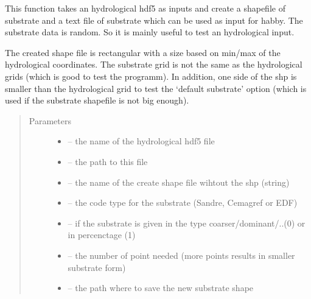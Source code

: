 \documentclass[letterpaper,10pt,english]{sphinxmanual}
\begin{document}
\begin{fulllineitems}
\label{\detokenize{index:src.substrate.create_dummy_substrate_from_hydro}}
This function takes an hydrological hdf5 as inputs and create a shapefile of substrate and a text file of substrate
which can be used as input for habby. The substrate data is random. So it is mainly useful to test an hydrological
input.

The created shape file is rectangular with a size based on min/max of the hydrological coordinates. The substrate
grid is not the same as the hydrological grids (which is good to test the programm). In addition, one side of the shp
is smaller than the hydrological grid to test the `default substrate' option (which is used if the substrate
shapefile is not big enough).
\begin{quote}\begin{description}
\item[{Parameters}] \leavevmode\begin{itemize}
\item {} 
 -- the name of the hydrological hdf5 file

\item {} 
 -- the path to this file

\item {} 
 -- the name of the create shape file wihtout the shp (string)

\item {} 
 -- the code type for the substrate (Sandre, Cemagref or EDF)

\item {} 
 -- if the substrate is given in the type coarser/dominant/..(0) or in percenctage (1)

\item {} 
 -- the number of point needed (more points results in smaller substrate form)

\item {} 
 -- the path where to save the new substrate shape

\end{itemize}

\end{description}\end{quote}

\end{fulllineitems}
\end{document}

